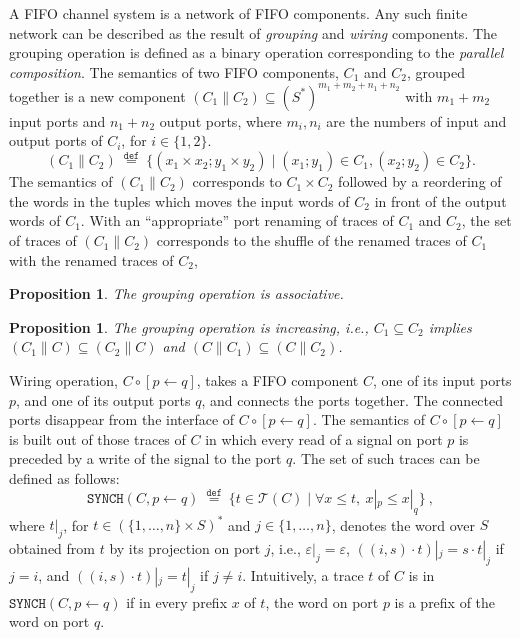 \documentclass{llncs}
\newtheorem{prop}[thm]{Proposition}
\newcommand{\out}[1]{}
\newcommand{\df}[1]{\ \stackrel{\mathtt{def}}{#1}\ }
\begin{document}
A FIFO channel system is a network of FIFO components. Any such finite
network can be described as the result of \emph{grouping} and
\emph{wiring} components. The grouping operation is defined as a
binary operation corresponding to the \emph{parallel composition}.
The semantics of two FIFO components, $C_1$ and $C_2$, grouped
together is a new component $(C_1\parallel C_2)\subseteq
(S^\ast)^{m_1+m_2+n_1+n_2}$ with $m_1+m_2$ input ports and $n_1+n_2$
output ports, where $m_i, n_i$ are the numbers of input and output ports of
$C_i$, for $i\in\{1,2\}$.
\[(C_1\parallel C_2) \df{=} \{(x_1\times x_2;y_1\times y_2) \mid
(x_1;y_1)\in C_1, (x_2;y_2)\in C_2\}.
\]
The semantics of $(C_1\parallel C_2)$ corresponds to $C_1\times C_2$
followed by a reordering of the words in the tuples which moves the
input words of $C_2$ in front of the output words of $C_1$.  With an
``appropriate''\out{\footnote{The port renaming $ren(p)$ is $p$ if $p$ is an
  input port in $C_1$, $p+m_2$ if $p$ is an output port in $C_1$,
  $p+m_1$ if $p$ is an input port in $C_2$, and $p+m_1+n_1$ if $p$ is
  an output port in $C_2$, where $m_1$, $n_1$ are the numbers of input
  and output ports in $C_1$, respectively, and $m_2$ is the number of
  input ports in $C_2$.}}  port renaming of traces of $C_1$ and $C_2$,
the set of traces of $(C_1\parallel C_2)$ corresponds to the shuffle
of the renamed traces of $C_1$ with the renamed traces of $C_2$,

\begin{prop}\label{prop:par-assoc}
  The grouping operation is associative.
\end{prop}
\begin{prop}\label{prop:par-increasing}
  The grouping operation is increasing, i.e., $C_1\subseteq C_2$
  implies $(C_1\parallel C)\subseteq (C_2\parallel C)$ and
  $(C\parallel C_1)\subseteq (C\parallel C_2)$.
\end{prop}

\noindent
Wiring operation, $C\circ[p\leftarrow q]$, takes a FIFO
component $C$, one of its input ports $p$, and one of its output ports
$q$, and connects the ports together. The connected ports disappear
from the interface of $C\circ[p\leftarrow q]$. The semantics of
$C\circ[p\leftarrow q]$ is built out of those traces of $C$ in which
every read of a signal on port $p$ is preceded by a write of the
signal to the port $q$. The set of such traces can be defined as
follows: 
\[\mathtt{SYNCH}(C,p\leftarrow q) \df{=}
\{t\in \mathcal{T}(C) \mid
  \forall x\leq t, ~ x|_{p} \leq x|_{q} \}~,
\]
where $t|_{j}$, for $t\in(\{1, \ldots, n \}\times S)^\ast$ and
$j\in\{1,\ldots,n\}$, denotes the word over $S$ obtained from $t$ by
its projection on port $j$, i.e., $\varepsilon|_{j}=\varepsilon$,
$((i,s)\cdot t)|_{j}= s\cdot t|_{j}$ if $j= i$, and $((i,s)\cdot
t)|_{j}=t|_{j}$ if $j\neq i$. Intuitively, a trace $t$ of $C$ is in
$\mathtt{SYNCH}(C,p\leftarrow q)$ if in every prefix $x$ of $t$, the
word on port $p$ is a prefix of the word on port $q$.
\end{document}
